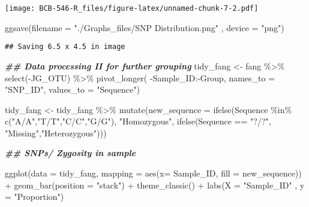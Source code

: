 \documentclass[
]{article}
\newenvironment{Shaded}{\begin{snugshade}}{\end{snugshade}}
\newcommand{\AttributeTok}[1]{\textcolor[rgb]{0.77,0.63,0.00}{#1}}
\newcommand{\DocumentationTok}[1]{\textcolor[rgb]{0.56,0.35,0.01}{\textbf{\textit{#1}}}}
\newcommand{\FunctionTok}[1]{\textcolor[rgb]{0.00,0.00,0.00}{#1}}
\newcommand{\NormalTok}[1]{#1}
\newcommand{\OtherTok}[1]{\textcolor[rgb]{0.56,0.35,0.01}{#1}}
\newcommand{\SpecialCharTok}[1]{\textcolor[rgb]{0.00,0.00,0.00}{#1}}
\newcommand{\StringTok}[1]{\textcolor[rgb]{0.31,0.60,0.02}{#1}}
\begin{document}
\texttt{[image: BCB-546-R\_files/figure-latex/unnamed-chunk-7-2.pdf]}

\begin{Shaded}
\begin{Highlighting}[]
\FunctionTok{ggsave}\NormalTok{(}\AttributeTok{filename =} \StringTok{"./Graphs\_files/SNP Distribution.png"}\NormalTok{ , }\AttributeTok{device =} \StringTok{"png"}\NormalTok{)}
\end{Highlighting}
\end{Shaded}

\begin{verbatim}
## Saving 6.5 x 4.5 in image
\end{verbatim}

\begin{Shaded}
\begin{Highlighting}[]
\DocumentationTok{\#\# Data processing II for further grouping}
\NormalTok{tidy\_fang }\OtherTok{\textless{}{-}}\NormalTok{ fang }\SpecialCharTok{\%\textgreater{}\%} \FunctionTok{select}\NormalTok{(}\SpecialCharTok{{-}}\NormalTok{JG\_OTU) }\SpecialCharTok{\%\textgreater{}\%} 
  \FunctionTok{pivot\_longer}\NormalTok{( }\SpecialCharTok{{-}}\NormalTok{Sample\_ID}\SpecialCharTok{:{-}}\NormalTok{Group, }\AttributeTok{names\_to =} \StringTok{"SNP\_ID"}\NormalTok{, }\AttributeTok{values\_to =} \StringTok{"Sequence"}\NormalTok{)}

\NormalTok{tidy\_fang }\OtherTok{\textless{}{-}}\NormalTok{ tidy\_fang }\SpecialCharTok{\%\textgreater{}\%} 
  \FunctionTok{mutate}\NormalTok{(}\AttributeTok{new\_sequence =} \FunctionTok{ifelse}\NormalTok{(Sequence }\SpecialCharTok{\%in\%} \FunctionTok{c}\NormalTok{(}\StringTok{"A/A"}\NormalTok{,}\StringTok{"T/T"}\NormalTok{,}\StringTok{"C/C"}\NormalTok{,}\StringTok{"G/G"}\NormalTok{), }\StringTok{"Homozygous"}\NormalTok{, }
  \FunctionTok{ifelse}\NormalTok{(Sequence }\SpecialCharTok{==} \StringTok{"?/?"}\NormalTok{, }\StringTok{"Missing"}\NormalTok{,}\StringTok{"Heterozygous"}\NormalTok{)))}

\DocumentationTok{\#\# SNPs/ Zygosity in sample}


\FunctionTok{ggplot}\NormalTok{(}\AttributeTok{data =}\NormalTok{ tidy\_fang, }\AttributeTok{mapping =} \FunctionTok{aes}\NormalTok{(}\AttributeTok{x=}\NormalTok{ Sample\_ID, }\AttributeTok{fill =}\NormalTok{ new\_sequence)) }\SpecialCharTok{+} \FunctionTok{geom\_bar}\NormalTok{(}\AttributeTok{position =} \StringTok{"stack"}\NormalTok{) }\SpecialCharTok{+} \FunctionTok{theme\_classic}\NormalTok{() }\SpecialCharTok{+} \FunctionTok{labs}\NormalTok{(}\AttributeTok{X =} \StringTok{"Sample\_ID"}\NormalTok{ , }\AttributeTok{y =} \StringTok{"Proportion"}\NormalTok{)}
\end{Highlighting}
\end{Shaded}
\end{document}

